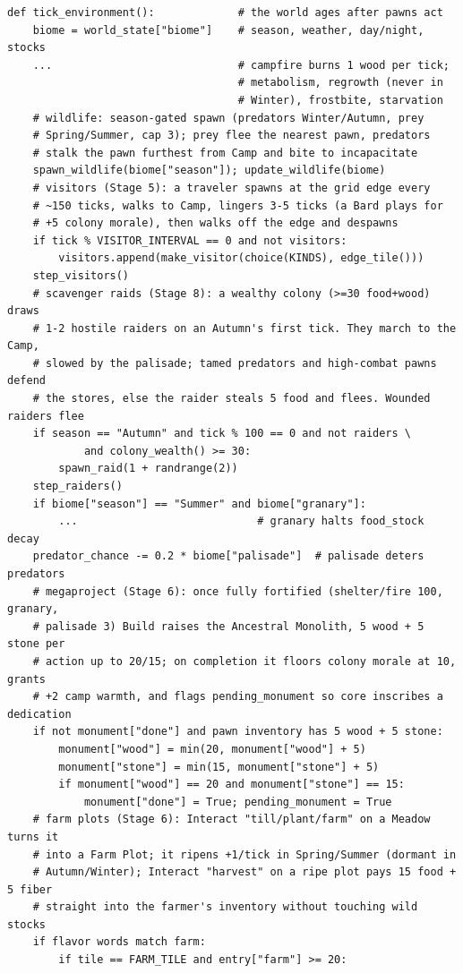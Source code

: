 \documentclass[10pt,a4paper]{article}
\begin{document}
\begin{lstlisting}
def tick_environment():             # the world ages after pawns act
    biome = world_state["biome"]    # season, weather, day/night, stocks
    ...                             # campfire burns 1 wood per tick;
                                    # metabolism, regrowth (never in
                                    # Winter), frostbite, starvation
    # wildlife: season-gated spawn (predators Winter/Autumn, prey
    # Spring/Summer, cap 3); prey flee the nearest pawn, predators
    # stalk the pawn furthest from Camp and bite to incapacitate
    spawn_wildlife(biome["season"]); update_wildlife(biome)
    # visitors (Stage 5): a traveler spawns at the grid edge every
    # ~150 ticks, walks to Camp, lingers 3-5 ticks (a Bard plays for
    # +5 colony morale), then walks off the edge and despawns
    if tick % VISITOR_INTERVAL == 0 and not visitors:
        visitors.append(make_visitor(choice(KINDS), edge_tile()))
    step_visitors()
    # scavenger raids (Stage 8): a wealthy colony (>=30 food+wood) draws
    # 1-2 hostile raiders on an Autumn's first tick. They march to the Camp,
    # slowed by the palisade; tamed predators and high-combat pawns defend
    # the stores, else the raider steals 5 food and flees. Wounded raiders flee
    if season == "Autumn" and tick % 100 == 0 and not raiders \
            and colony_wealth() >= 30:
        spawn_raid(1 + randrange(2))
    step_raiders()
    if biome["season"] == "Summer" and biome["granary"]:
        ...                            # granary halts food_stock decay
    predator_chance -= 0.2 * biome["palisade"]  # palisade deters predators
    # megaproject (Stage 6): once fully fortified (shelter/fire 100, granary,
    # palisade 3) Build raises the Ancestral Monolith, 5 wood + 5 stone per
    # action up to 20/15; on completion it floors colony morale at 10, grants
    # +2 camp warmth, and flags pending_monument so core inscribes a dedication
    if not monument["done"] and pawn inventory has 5 wood + 5 stone:
        monument["wood"] = min(20, monument["wood"] + 5)
        monument["stone"] = min(15, monument["stone"] + 5)
        if monument["wood"] == 20 and monument["stone"] == 15:
            monument["done"] = True; pending_monument = True
    # farm plots (Stage 6): Interact "till/plant/farm" on a Meadow turns it
    # into a Farm Plot; it ripens +1/tick in Spring/Summer (dormant in
    # Autumn/Winter); Interact "harvest" on a ripe plot pays 15 food + 5 fiber
    # straight into the farmer's inventory without touching wild stocks
    if flavor words match farm:
        if tile == FARM_TILE and entry["farm"] >= 20:

\end{lstlisting}
\end{document}
